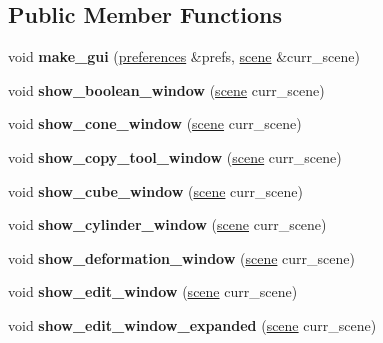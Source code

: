 \subsection*{Public Member Functions}
\begin{DoxyCompactItemize}
\item 
\mbox{\label{classts__gui_a20eb0ba14a0422343bc1fbd6da447613}} 
void {\bfseries make\+\_\+gui} (\hyperlink{classpreferences}{preferences} \&prefs, \hyperlink{classscene}{scene} \&curr\+\_\+scene)
\item 
\mbox{\label{classts__gui_aa62fc0b09602ef9a5eb7e366b72adb96}} 
void {\bfseries show\+\_\+boolean\+\_\+window} (\hyperlink{classscene}{scene} curr\+\_\+scene)
\item 
\mbox{\label{classts__gui_a7eac2baa37321ab5a583560154f3677e}} 
void {\bfseries show\+\_\+cone\+\_\+window} (\hyperlink{classscene}{scene} curr\+\_\+scene)
\item 
\mbox{\label{classts__gui_a728cf6a52ac5a19c809f7e094966f2f1}} 
void {\bfseries show\+\_\+copy\+\_\+tool\+\_\+window} (\hyperlink{classscene}{scene} curr\+\_\+scene)
\item 
\mbox{\label{classts__gui_a28ff773fa94375c6969aa469cca9c282}} 
void {\bfseries show\+\_\+cube\+\_\+window} (\hyperlink{classscene}{scene} curr\+\_\+scene)
\item 
\mbox{\label{classts__gui_a293dff767578086ad64dd6e638a5a015}} 
void {\bfseries show\+\_\+cylinder\+\_\+window} (\hyperlink{classscene}{scene} curr\+\_\+scene)
\item 
\mbox{\label{classts__gui_ac6278469f358d0bc05462d7915661631}} 
void {\bfseries show\+\_\+deformation\+\_\+window} (\hyperlink{classscene}{scene} curr\+\_\+scene)
\item 
\mbox{\label{classts__gui_a397caf6bc3457d0a220d9389653cb8b1}} 
void {\bfseries show\+\_\+edit\+\_\+window} (\hyperlink{classscene}{scene} curr\+\_\+scene)
\item 
\mbox{\label{classts__gui_a95cb7bec95d01a89c96b617dd7e14228}} 
void {\bfseries show\+\_\+edit\+\_\+window\+\_\+expanded} (\hyperlink{classscene}{scene} curr\+\_\+scene)

\end{DoxyCompactItemize}
